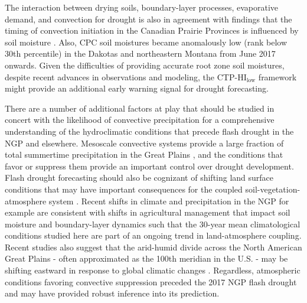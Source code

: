\documentclass[hess, manuscript]{copernicus}
\begin{document}
The interaction between drying soils, boundary-layer processes, evaporative demand, and convection for drought is also in agreement with findings that the timing of convection initiation in the Canadian Prairie Provinces is influenced by soil moisture \citep{Hanesiak_2004}. Also, CPC soil moistures \citep{Fan_2004} became anomalously low (rank below 30th percentile) in the Dakotas and northeastern Montana from June 2017 onwards. Given the difficulties of providing accurate root zone soil moistures, despite recent advances in observations and modeling, the CTP-$\mathrm{HI_{low}}$  framework might provide an additional early warning signal for drought forecasting. 

There are a number of additional factors at play that should be studied in concert with the likelihood of convective precipitation for a comprehensive understanding of the hydroclimatic conditions that precede flash drought in the NGP and elsewhere. Mesoscale convective systems provide a large fraction of total summertime precipitation in the Great Plains \citep{Carbone_2008, Tuttle_2006}, and the conditions that favor or suppress them provide an important control over drought development. Flash drought forecasting should also be cognizant of shifting land surface conditions that may have important consequences for the coupled soil-vegetation-atmosphere system \citep{Otkin_2016}. Recent shifts in climate and precipitation in the NGP  for example are consistent with shifts in agricultural management that impact soil moisture and boundary-layer dynamics \citep{Gameda_2007, Betts_2013, Betts_2014, Mahmood_2014, Vick_2016} such that the 30-year mean climatological conditions studied here are part of an ongoing trend in land-atmosphere coupling. Recent studies also suggest that the arid-humid divide across the North American Great Plains - often approximated as the 100th meridian in the U.S. - may be shifting eastward in response to global climatic changes \citep{Seager_2018}. Regardless, atmospheric conditions favoring convective suppression preceded the 2017 NGP flash drought and may have provided robust inference into its prediction.
\end{document}
